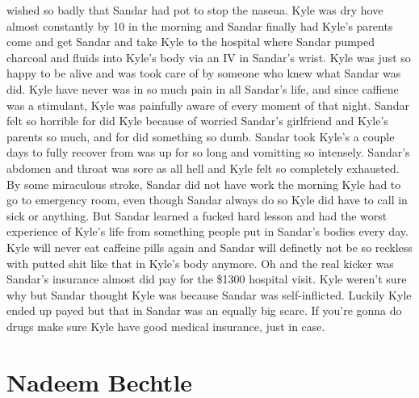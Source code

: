 \documentclass[12pt]{book}
\begin{document}
wished so badly that Sandar had pot to stop the naseua. Kyle was dry hove almost constantly by 10 in the morning and Sandar finally had Kyle's parents come and get Sandar and take Kyle to the hospital where Sandar pumped charcoal and fluids into Kyle's body via an IV in Sandar's wrist. Kyle was just so happy to be alive and was took care of by someone who knew what Sandar was did. Kyle have never was in so much pain in all Sandar's life, and since caffiene was a stimulant, Kyle was painfully aware of every moment of that night. Sandar felt so horrible for did Kyle because of worried Sandar's girlfriend and Kyle's parents so much, and for did something so dumb. Sandar took Kyle's a couple days to fully recover from was up for so long and vomitting so intensely. Sandar's abdomen and throat was sore as all hell and Kyle felt so completely exhausted. By some miraculous stroke, Sandar did not have work the morning Kyle had to go to emergency room, even though Sandar always do so Kyle did have to call in sick or anything. But Sandar learned a fucked hard lesson and had the worst experience of Kyle's life from something people put in Sandar's bodies every day. Kyle will never eat caffeine pills again and Sandar will definetly not be so reckless with putted shit like that in Kyle's body anymore. Oh and the real kicker was Sandar's insurance almost did pay for the \$1300 hospital visit. Kyle weren't sure why but Sandar thought Kyle was because Sandar was self-inflicted. Luckily Kyle ended up payed but that in Sandar was an equally big scare. If you're gonna do drugs make sure Kyle have good medical insurance, just in case.



\chapter{Nadeem Bechtle}
\end{document}
